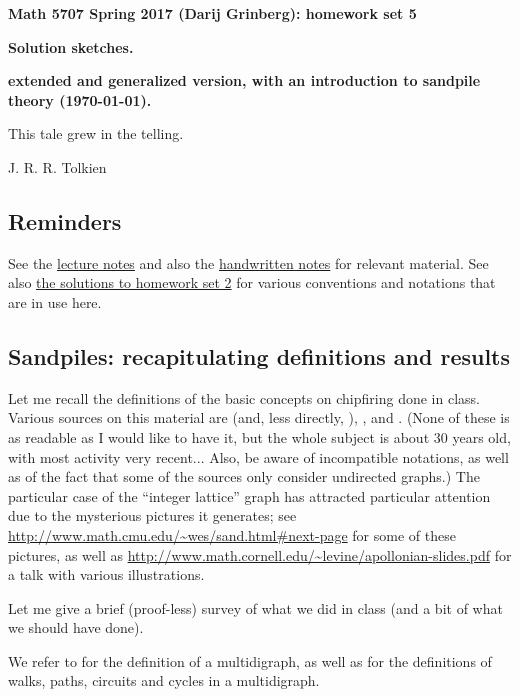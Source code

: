 \documentclass[numbers=enddot,12pt,final,onecolumn,notitlepage]{scrartcl}%
\theoremstyle{definition}
\begin{document}
\begin{center}
\textbf{Math 5707 Spring 2017 (Darij Grinberg): homework set 5}

\textbf{Solution sketches.}

\textbf{extended and generalized version, with an introduction to sandpile theory (\today).}
\end{center}

\epigraph{This tale grew in the telling.}{J. R. R. Tolkien}

\tableofcontents

\subsection{Reminders}

See the
\href{http://www-users.math.umn.edu/~dgrinber/5707s17/nogra.pdf}{lecture notes}
and also the
\href{http://www-users.math.umn.edu/~dgrinber/5707s17/}{handwritten notes}
for relevant material.
See also
\href{http://www-users.math.umn.edu/~dgrinber/5707s17/hw2s.pdf}{the solutions to homework set 2}
\cite{hw2s}
for various conventions and notations that are in use here.

\subsection{Sandpiles: recapitulating definitions and results}

Let me recall the definitions of the basic concepts on chipfiring
done in class.
Various sources on this material are
\cite{BjoLov92} (and, less directly, \cite{BjLoSh91}),
\cite{HLMPPW13}, \cite[Lectures 29--31]{Musike09} and \cite{CorPet16}.
(None of these is as readable as I would like to have it, but the
whole subject is about 30 years old, with most activity very
recent...
Also, be aware of incompatible notations, as well as of the fact that
some of the sources only consider undirected graphs.)
The particular case of the ``integer lattice'' graph has attracted
particular attention due to the mysterious pictures it generates;
see \url{http://www.math.cmu.edu/~wes/sand.html#next-page} for some
of these pictures, as well as
\url{http://www.math.cornell.edu/~levine/apollonian-slides.pdf} for a
talk with various illustrations.

Let me give a brief (proof-less) survey of what we did in class (and
a bit of what we should have done).

We refer to \cite{hw2s} for the definition of a multidigraph, as well
as for the definitions of walks, paths, circuits and cycles in a
multidigraph.
\end{document}
